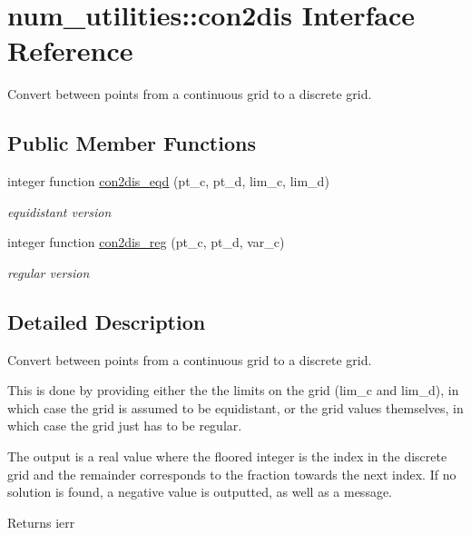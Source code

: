 \hypertarget{interfacenum__utilities_1_1con2dis}{}\section{num\+\_\+utilities\+:\+:con2dis Interface Reference}
\label{interfacenum__utilities_1_1con2dis}


Convert between points from a continuous grid to a discrete grid.  


\subsection*{Public Member Functions}
\begin{DoxyCompactItemize}
\item 
integer function \hyperlink{interfacenum__utilities_1_1con2dis_a40d4020a9fc7bb206679d365cfae795c}{con2dis\+\_\+eqd} (pt\+\_\+c, pt\+\_\+d, lim\+\_\+c, lim\+\_\+d)
\begin{DoxyCompactList}\small\item\em equidistant version \end{DoxyCompactList}\item 
integer function \hyperlink{interfacenum__utilities_1_1con2dis_a048d7a6b4f646f06a359b6244ba69204}{con2dis\+\_\+reg} (pt\+\_\+c, pt\+\_\+d, var\+\_\+c)
\begin{DoxyCompactList}\small\item\em regular version \end{DoxyCompactList}\end{DoxyCompactItemize}


\subsection{Detailed Description}
Convert between points from a continuous grid to a discrete grid. 

This is done by providing either the the limits on the grid ({\ttfamily lim\+\_\+c} and {\ttfamily lim\+\_\+d}), in which case the grid is assumed to be equidistant, or the grid values themselves, in which case the grid just has to be regular.

The output is a real value where the floored integer is the index in the discrete grid and the remainder corresponds to the fraction towards the next index. If no solution is found, a negative value is outputted, as well as a message.

\begin{DoxyReturn}{Returns}
ierr 
\end{DoxyReturn}


